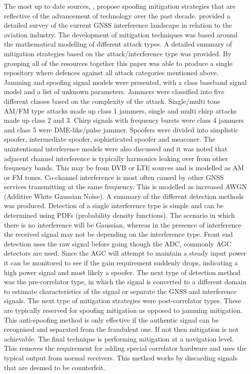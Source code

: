 The most up to date sources, \cite{RN34} \cite{RN36} \cite{RN18}, propose spoofing mitigation strategies that are reflective of the advancement of technology over the
past decade. \textcite{RN34} provided a detailed survey of the current GNSS interference landscape in relation to the aviation industry. The development of mitigation
techniques was based around the mathematical modelling of different attack types. A detailed summary of mitigation strategies
based on the attack/interference type was provided. By grouping all of the resources together this paper was able to produce a single repository where defences against
all attack categories mentioned above. Jamming and spoofing signal models were presented, with a class baseband signal model and a list of unknown parameters. Jammers
were classified into five different classes based on the complexity of the attack. Single/multi tone AM/FM type attacks made up class 1 jammers, single and multi chirp
attacks made up class 2 and 3. Chirp signals with frequency bursts were class 4 jammers and class 5 were DME-like/pulse jammer. Spoofers were divided into simplistic
spoofer, intermediate spoofer, sophisticated spoofer and meaconer. The unintentional interference models were also discussed and it was noted that adjacent channel
interference is typically harmonics leaking over from other frequency bands. This may be from DVB or LTE sources and is modelled as AM or FM tones. Co-channel
interference is most often caused by other GNSS services transmitting at the same frequency. This is modelled as increased AWGN (Additive White Gaussian Noise). A summary
of the different detection methods was produced. Detection of a single interference type is simple and can be determined using PDFs (probability density functions). The
scenario in which there is no interference will be Gaussian, whereas in the presence of interference the received signal may not be depending on the interference type.
Front end detection uses the raw signal before going though the ADC, commonly AGC detectors are used. Since the AGC will attempt to maintain a steady input power it can
be monitored to see if the gain requirement suddenly drops, indicating a high power signal and most likely a spoofer. The next type of detection method was the
pre-correlator type, in which the signal is converted to a different domain to estimate characteristics of the signal or separate the GNSS and interference signals. The
next type of mitigation strategies were post-correlator types. These are typically reserved for spoofing mitigation as opposed to jamming mitigation. This anti-spoofing
method is only effective if the authentic signal can be recognised and separated from the fraudulent one. If not then mitigation is not achievable. The final technique is
performing mitigation at a navigation level. This removes the requirement for adding special correlator hardware and uses the typical output from normal receivers. This
method works by discarding signals that are deemed to be counterfeit.

